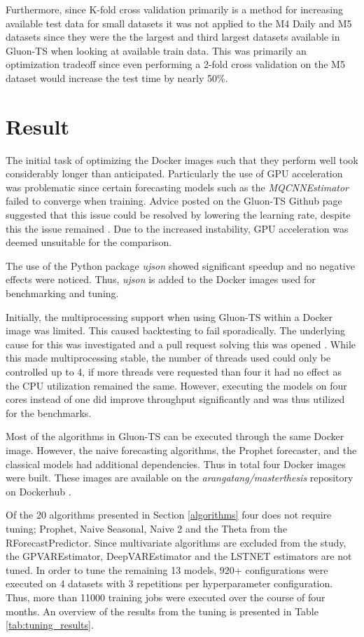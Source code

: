 Furthermore, since K-fold cross validation primarily is a method for increasing available test data for small datasets it was not applied to the M4 Daily and M5 datasets since they were the the largest and third largest datasets available in Gluon-TS when looking at available train data. This was primarily an optimization tradeoff since even performing a 2-fold cross validation on the M5 dataset would increase the test time by nearly 50\%.

\section{Result}
\label{sec:empirical_result}
The initial task of optimizing the Docker images such that they perform well took considerably longer than anticipated. Particularly the use of GPU acceleration was problematic since certain forecasting models such as the \textit{MQCNNEstimator} failed to converge when training. Advice posted on the Gluon-TS Github page suggested that this issue could be resolved by lowering the learning rate, despite this the issue remained \cite{gluonts-github}. Due to the increased instability, GPU acceleration was deemed unsuitable for the comparison.

The use of the Python package \textit{ujson} showed significant speedup and no negative effects were noticed. Thus, \textit{ujson} is added to the Docker images used for benchmarking and tuning.

Initially, the multiprocessing support when using Gluon-TS within a Docker image was limited. This caused backtesting to fail sporadically. The underlying cause for this was investigated and a pull request solving this was opened \cite{fix_dockerfile_pr}. While this made multiprocessing stable, the number of threads used could only be controlled up to 4, if more threads vere requested than four it had no effect as the CPU utilization remained the same. However, executing the models on four cores instead of one did improve throughput significantly and was thus utilized for the benchmarks.

Most of the algorithms in Gluon-TS can be executed through the same Docker image. However, the naive forecasting algorithms, the Prophet forecaster, and the classical models had additional dependencies. Thus in total four Docker images were built. These images are available on the \textit{arangatang/masterthesis} repository on Dockerhub \cite{dockerhub_arangatang}.

Of the 20 algorithms presented in Section \ref{algorithms} four does not require tuning; Prophet, Naive Seasonal, Naive 2 and the Theta from the RForecastPredictor. Since multivariate algorithms are excluded from the study, the GPVAREstimator, DeepVAREstimator and the LSTNET estimators are not tuned. In order to tune the remaining 13 models, 920+ configurations were executed on 4 datasets with 3 repetitions per hyperparameter configuration. Thus, more than 11000 training jobs were executed over the course of four months. An overview of the results from the tuning is presented in Table \ref{tab:tuning_results}.

